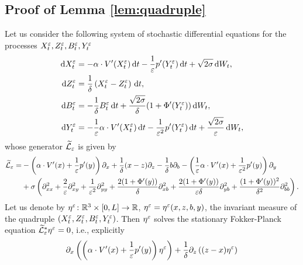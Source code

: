 \documentclass[10pt]{article}
\begin{document}
\begin{appendices}
\subsection{Proof of Lemma \ref{lem:quadruple}}

	Let us consider the following system of stochastic differential equations for the processes $X_t^\varepsilon, Z_t^\varepsilon, B_t^\varepsilon, Y_t^\varepsilon$
	\begin{equation}
	\label{eq:systemSDEquadruple}
	\begin{aligned}
	\mathrm{d} X_t^\varepsilon &= -\alpha \cdot V'(X_t^\varepsilon) \,\mathrm{d} t - \frac1{\varepsilon} p'(Y_t^\varepsilon) \,\mathrm{d} t+ \sqrt{2\sigma} \,\mathrm{d} W_t, \\
	\mathrm{d} Z_t^\varepsilon &= \frac1\delta \left ( X^\varepsilon_t - Z^\varepsilon_t \right ) \,\mathrm{d} t, \\
	\mathrm{d} B_t^\varepsilon &= - \frac1\delta B_t^\varepsilon \,\mathrm{d} t + \frac{\sqrt{2\sigma}}{\delta}(1+\Phi'(Y_t^\varepsilon)) \,\mathrm{d} W_t, \\
	\mathrm{d} Y_t^\varepsilon &= -\frac1{\varepsilon} \alpha \cdot V'(X_t^\varepsilon) \,\mathrm{d} t - \frac{1}{\varepsilon^2} p'(Y_t^\varepsilon) \,\mathrm{d} t+ \frac{\sqrt{2\sigma}}{\varepsilon} \,\mathrm{d} W_t,
	\end{aligned}
	\end{equation}
	whose generator $\widetilde{\mathcal L}_\varepsilon$ is given by
	\begin{equation}
	\begin{aligned}
	\widetilde{\mathcal L}_\varepsilon =& -\left( \alpha \cdot V'(x) + \frac1{\varepsilon} p'(y) \right) \partial_x + \frac1\delta (x-z) \partial_z - \frac1\delta b \partial_b - \left( \frac1{\varepsilon} \alpha \cdot V'(x) + \frac{1}{\varepsilon^2} p'(y) \right) \partial_y \\
	& + \sigma \left( \partial_{xx}^2 + \frac2{\varepsilon} \partial_{xy}^2 + \frac{1}{\varepsilon^2} \partial_{yy}^2 + \frac{2(1+\Phi'(y))}{\delta} \partial_{xb}^2 + \frac{2(1+\Phi'(y))}{\varepsilon \delta} \partial_{yb}^2 + \frac{(1+\Phi'(y))^2}{\delta^2} \partial_{bb}^2 \right).
	\end{aligned}
	\end{equation}
	Let us denote by $\eta^\varepsilon \colon \mathbb{R}^3 \times [0,L] \to \mathbb{R}$, $\eta^\varepsilon = \eta^\varepsilon(x,z,b,y)$, the invariant measure of the quadruple $(X_t^\varepsilon, Z_t^\varepsilon, B_t^\varepsilon, Y_t^\varepsilon)$. Then $\eta^\varepsilon$ solves the stationary Fokker-Planck equation $\widetilde{\mathcal L}_\varepsilon^* \eta^\varepsilon = 0$, i.e., explicitly
	\begin{equation} \label{eq:FPSDEquadruple}
	\begin{aligned}
	&\partial_x \left( \left( \alpha \cdot V'(x) + \frac1\epl p'(y) \right) \eta^\epl \right) + \frac1\delta\partial_z \left( (z-x) \eta^\epl \right) \\

\end{aligned}
\end{equation}
\end{appendices}
\end{document}
